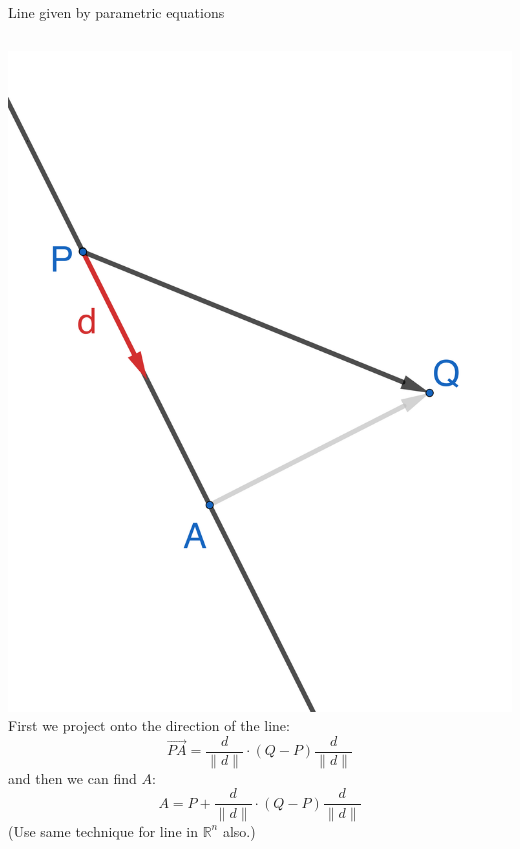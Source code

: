 \documentclass{beamer}
\begin{document}
\begin{frame}{Line given by parametric equations}
    \begin{columns}
        \hspace{-1cm}
        \includegraphics[scale=0.6]{2d-parametric-closest.png}
        First we project onto the direction of the line:
        \begin{equation*}
            \overrightarrow {PA} = \frac{d}{\|d\|}\cdot (Q-P)\frac{d}{\|d\|}
        \end{equation*}
        and then we can find $A$:
        \begin{equation*}
            A = P + \frac{d}{\|d\|}\cdot (Q-P)\frac{d}{\|d\|}
        \end{equation*}
        (Use same technique for line in $\mathbb R^n$ also.)
    \end{columns}
\end{frame}
\end{document}
